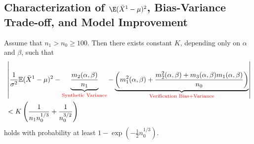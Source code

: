 \subsection{Characterization of $\E(\bar{X}^{1}-\mu)^2$, Bias-Variance Trade-off, and Model Improvement}

\begin{theorem}\label{thm:gaussian:main}
    Assume that \( n_1 > n_0 \geq 100\). Then there exists constant \( K\), depending only on \(\alpha\) and \(\beta\), such that
    \begin{align}
         &\left| \frac{1}{\sigma^2}\mathbb{E}(\bar{X}^1-\mu)^2 - \underbrace{\frac{m_2(\alpha,\beta)}{n_1}}_{\textcolor{red}{\text{Synthetic Variance}}} - \underbrace{\bigg(m_1^2(\alpha,\beta) + \frac{m^2_2(\alpha,\beta)+m_3(\alpha,\beta)m_1(\alpha,\beta)}{n_0}\bigg)}_{\textcolor{red}{\text{Verification Bias+Variance}}} \right| \notag\\
         & < K\left(\frac{1}{n_1n^{1/3}_0}+\frac{1}{n^{3/2}_0}\right)\label{equ:high_prob_y'}
    \end{align}
     holds with probability at least \( 1 - \exp\left(-\frac{1}{2}n_0^{1/3}\right) \).
\end{theorem}

